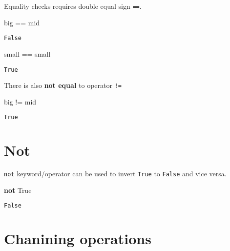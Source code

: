 \documentclass[
  letterpaper,
  DIV=11,
  numbers=noendperiod]{scrreprt}
\newenvironment{Shaded}{\begin{snugshade}}{\end{snugshade}}
\newcommand{\KeywordTok}[1]{\textcolor[rgb]{0.00,0.23,0.31}{\textbf{#1}}}
\newcommand{\NormalTok}[1]{\textcolor[rgb]{0.00,0.23,0.31}{#1}}
\newcommand{\OperatorTok}[1]{\textcolor[rgb]{0.37,0.37,0.37}{#1}}
\newcommand{\VariableTok}[1]{\textcolor[rgb]{0.07,0.07,0.07}{#1}}
\begin{document}
Equality checks requires double equal sign \texttt{==}.

\begin{Shaded}
\begin{Highlighting}[]
\NormalTok{big }\OperatorTok{==}\NormalTok{ mid}
\end{Highlighting}
\end{Shaded}

\begin{verbatim}
False
\end{verbatim}

\begin{Shaded}
\begin{Highlighting}[]
\NormalTok{small }\OperatorTok{==}\NormalTok{ small}
\end{Highlighting}
\end{Shaded}

\begin{verbatim}
True
\end{verbatim}

There is also \textbf{not equal} to operator \texttt{!=}

\begin{Shaded}
\begin{Highlighting}[]
\NormalTok{big }\OperatorTok{!=}\NormalTok{ mid}
\end{Highlighting}
\end{Shaded}

\begin{verbatim}
True
\end{verbatim}

\section{Not}\label{not}

\texttt{not} keyword/operator can be used to invert \texttt{True} to
\texttt{False} and vice versa.

\begin{Shaded}
\begin{Highlighting}[]
\KeywordTok{not} \VariableTok{True}
\end{Highlighting}
\end{Shaded}

\begin{verbatim}
False
\end{verbatim}

\section{Chanining operations}\label{chanining-operations}
\end{document}
